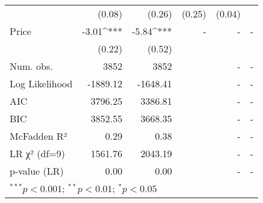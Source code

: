 \begin{table}[h]
\begin{center}
\begin{tabular}{l D{.}{.}{5.5} D{.}{.}{5.5} D{.}{.}{2.5} D{.}{.}{2.5} D{.}{.}{3.2}}
                                   & (0.08)      & (0.26)      & (0.25)      & (0.04)     &        \\
Price                              & -3.01^{***} & -5.84^{***} &  -          &  -         &  -     \\
                                   & (0.22)      & (0.52)      &             &            &        \\
\midrule
Num. obs.                          & 3852        & 3852        &             & -          &  -     \\
Log Likelihood                     & -1889.12    & -1648.41    &             & -          &  -     \\
AIC                                & 3796.25     & 3386.81     &             & -          &  -     \\
BIC                                & 3852.55     & 3668.35     &             & -          &  -     \\
McFadden R²                        & 0.29        & 0.38        &             & -          &  -     \\
LR χ² (df=9)                       & 1561.76     & 2043.19     &             & -          &  -     \\
p-value (LR)                       & 0.00        & 0.00        &             & -          &  -     \\
\bottomrule
{}
\end{tabular}

\end{center}
\end{table}
